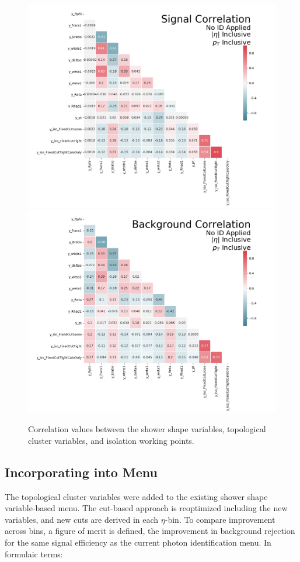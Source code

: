\begin{figure}[!thp]
    \centering
    \includegraphics[width=.77\textwidth]{chapters/chapter4_photonID/images/sig_none_corr.png}
    \includegraphics[width=.77\textwidth]{chapters/chapter4_photonID/images/bkg_none_corr.png}
    \caption{Correlation values between the shower shape variables, topological cluster variables, and isolation working points.}
    \label{fig:photonid-corrs}
\end{figure}

\subsection{Incorporating into Menu}

The topological cluster variables were added to the existing shower shape variable-based menu. The cut-based approach is reoptimized including the new variables, and new cuts are derived in each $\eta$-\pt bin.  To compare improvement across bins, a figure of merit is defined, the improvement in background rejection for the same signal efficiency as the current photon identification menu. In formulaic terms:

